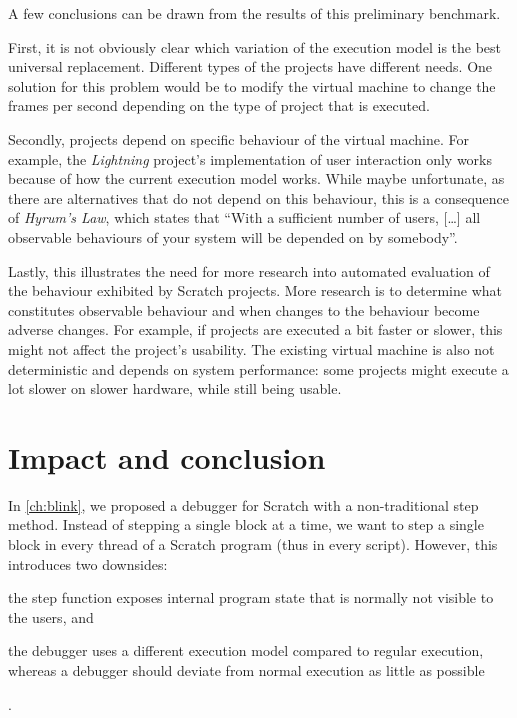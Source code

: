 \documentclass[../main]{subfiles}
\begin{document}
A few conclusions can be drawn from the results of this preliminary benchmark.

First, it is not obviously clear which variation of the execution model is the best universal replacement.
Different types of the projects have different needs.
One solution for this problem would be to modify the virtual machine to change the frames per second depending on the type of project that is executed.

Secondly, projects depend on specific behaviour of the virtual machine.
For example, the \textit{Lightning} project's implementation of user interaction only works because of how the current execution model works.
While maybe unfortunate, as there are alternatives that do not depend on this behaviour, this is a consequence of \textit{Hyrum's Law}, which states that ``With a sufficient number of users, [\dots] all observable behaviours of your system will be depended on by somebody''.

Lastly, this illustrates the need for more research into automated evaluation of the behaviour exhibited by Scratch projects.
More research is to determine what constitutes observable behaviour and when changes to the behaviour become adverse changes.
For example, if projects are executed a bit faster or slower, this might not affect the project's usability.
The existing virtual machine is also not deterministic and depends on system performance: some projects might execute a lot slower on slower hardware, while still being usable.

\section{Impact and conclusion}\label{sec:conclusion}

In \cref{ch:blink}, we proposed a debugger for Scratch with a non-traditional step method.
Instead of stepping a single block at a time, we want to step a single block in every thread of a Scratch program (thus in every script).
However, this introduces two downsides:
\begin{enumerate*}[label=\emph{\roman*})]
    \item the step function exposes internal program state that is normally not visible to the users, and
    \item the debugger uses a different execution model compared to regular execution, whereas a debugger should deviate from normal execution as little as possible
\end{enumerate*}.
\end{document}
